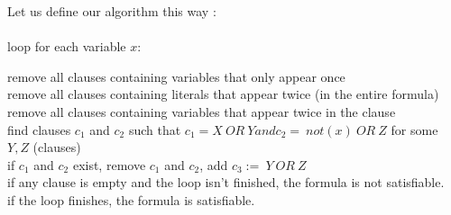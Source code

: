 Let us define our algorithm this way :\\\\
loop for each variable $x$:\

remove all clauses containing variables that only appear once	\\

remove all clauses containing literals that appear twice (in the entire formula)\\

remove all clauses containing variables that appear twice in the clause\\

find clauses $c_1$ and $c_2$ such that $c_1 = X\ OR\ Y and c_2 =\ not(x)\ OR\ Z$ for some $Y,Z$ (clauses)\\

if $c_1$ and $c_2$ exist, remove $c_1$ and $c_2$, add $c_3 :=\ Y\ OR\ Z$\\

if any clause is empty and the loop isn't finished, the formula is not satisfiable.\\

if the loop finishes, the formula is satisfiable.
